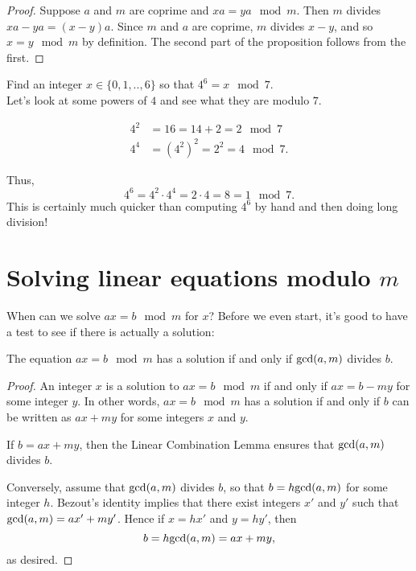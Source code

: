 \documentclass[11pt,dvipsnames]{book}
\def\gcd{{\rm gcd}}
\numberwithin{equation}{section} %
\numberwithin{figure}{section} %
\numberwithin{table}{section} %
\begin{document}
\begin{proof}
Suppose $a$ and $m$ are coprime and $xa = ya\mod m$. Then $m$ divides $xa-ya=(x-y)a$. Since $m$ and $a$ are coprime, $m$ divides $x-y$, and so $x = y\mod m$ by definition. The second part of the proposition follows from the first.
\end{proof}

\begin{example}
Find an integer $x\in \{0,1,..,6\}$ so that $4^{6} = x\mod 7$. \\

Let's look at some powers of $4$ and see what they are modulo $ 7$. 

\begin{align*}
4^2 & = 16 =14+2 = 2 \mod 7 \\
4^4 & = (4^2)^2  = 2^2 =4 \mod 7.
\end{align*}


Thus,
\[
4^6=4^2\cdot 4^4 = 2\cdot 4=8 = 1 \mod 7.
\]
This is certainly much quicker than computing $4^6$ by hand and then doing long division!
\end{example}



\section{Solving linear equations modulo $m$}


When can we solve $ax = b\mod m$ for $x$? Before we even start, it's good to have a test to see if there is actually a solution:

\begin{theorem}%
The equation $ax = b\mod m$ has a solution if and only if $\gcd(a,m)$ divides $b$. 
\end{theorem}


\begin{proof} An integer $x$ is a solution to $ax = b\mod m$ if and only if $ax=b-my$ for some integer $y$.
In other words, $ax = b\mod m$ has a solution if and only if $b$ can be written as $ax + my$ for some integers $x$ and $y$.

If $b = ax+my$, then the Linear Combination Lemma ensures that $\gcd(a,m)$ divides $b$. 

Conversely, assume that $\gcd(a,m)$ divides $b$, so that $b = h\gcd(a,m)$ for some integer $h$.
Bezout's identity implies that there exist integers $x'$ and $y'$ such that $\gcd(a,m)=ax'+my'$.
Hence if $x = hx'$ and $y=hy'$, then
\[
b = h\gcd(a,m) = ax + my,
\]
as desired.
\end{proof}
\end{document}

